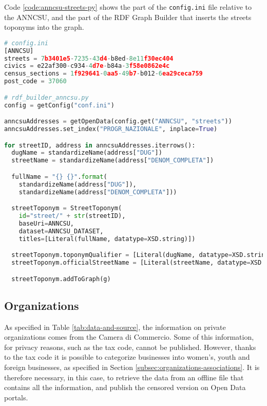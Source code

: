 Code \ref{code:anncsu-streets-py} shows the part of the \verb#config.ini# file relative to the ANNCSU, and the part of the \ac{RDF} Graph Builder that inserts the streets toponyms into the graph.

\begin{lstlisting}[language=python,caption={The part of the RDF Graph Builder that inserts the streets toponyms into the graph, and the config.ini file relative to the addresses.},label=code:anncsu-streets-py]
# config.ini
[ANNCSU]
streets = 7b3401e5-7235-43d4-b8ed-8e11f30ec404
civics = e22af300-c934-4d7e-b84a-3f58e0862e4c
census_sections = 1f929641-0aa5-49b7-b012-6ea29ceca759
post_code = 37060

# rdf_builder_anncsu.py
config = getConfig("conf.ini")

anncsuAddresses = getOpenData(config.get("ANNCSU", "streets"))
anncsuAddresses.set_index("PROGR_NAZIONALE", inplace=True)

for streetID, address in anncsuAddresses.iterrows():
  dugName = standardizeName(address["DUG"])
  streetName = standardizeName(address["DENOM_COMPLETA"])

  fullName = "{} {}".format(
    standardizeName(address["DUG"]),
    standardizeName(address["DENOM_COMPLETA"]))

  streetToponym = StreetToponym(
    id="street/" + str(streetID),
    baseUri=ANNCSU,
    dataset=ANNCSU_DATASET,
    titles=[Literal(fullName, datatype=XSD.string)])

  streetToponym.toponymQualifier = [Literal(dugName, datatype=XSD.string)]
  streetToponym.officialStreetName = [Literal(streetName, datatype=XSD.string)]

  streetToponym.addToGraph(g)
\end{lstlisting}

\subsection{Organizations}
\label{subsec:organizations-data}

As specified in Table \ref{tab:data-and-source}, the information on private organizations comes from the Camera di Commercio. Some of this information, for privacy reasons, such as the tax code, cannot be published. However, thanks to the tax code it is possible to categorize businesses into women's, youth and foreign businesses, as specified in Section \ref{subsec:organizations-associations}. It is therefore necessary, in this case, to retrieve the data from an offline file that contains all the information, and publish the censored version on Open Data portals.

